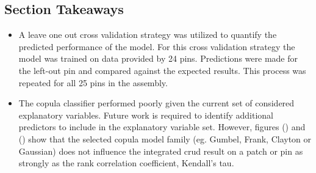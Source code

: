 \subsection{Section Takeaways}


\begin{itemize}
    \item A leave one out cross validation strategy was utilized to quantify the predicted performance of the model.  For this cross validation strategy the model was trained on data provided by 24 pins.  Predictions were made for the left-out pin and compared against the expected results.  This process was repeated for all 25 pins in the assembly.

	\item The copula classifier performed poorly given the current set of considered explanatory variables.  Future work is required to identify additional predictors to include in the explanatory variable set.  However, figures () and () show that the selected copula model family (eg. Gumbel, Frank, Clayton or Gaussian) does not influence the integrated crud result on a patch or pin as strongly as the rank correlation coefficient, Kendall's tau.
\end{itemize}
